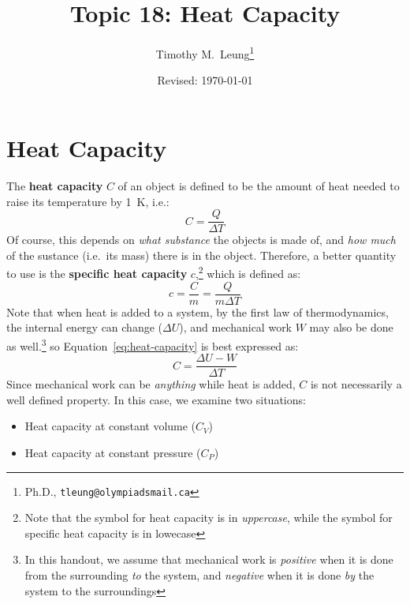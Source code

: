 \documentclass[11pt]{article}
\title{Topic 18: Heat Capacity}
\author{Timothy M.\ Leung\thanks{Ph.D., \texttt{tleung@olympiadsmail.ca}}}
\affil{Olympiads School\\Toronto, Ontario, Canada}
\date{Revised: \today}
\begin{document}
\maketitle


\section{Heat Capacity}

The \textbf{heat capacity} $C$ of an object is defined to be the amount of
heat needed to raise its temperature by \SI{1}{\kelvin}, i.e.:
\begin{equation}
  C=\frac{Q}{\Delta T}
  \label{eq:heat-capacity}
\end{equation}
Of course, this depends on \emph{what substance} the objects is made of, and
\emph{how much} of the sustance (i.e.\ its mass) there is in the object.
Therefore, a better quantity to use is the \textbf{specific heat capacity}
$c$,\footnote{Note that the symbol for heat capacity is in \emph{uppercase},
  while the symbol for specific heat capacity is in lowecase} which is defined
as:
\begin{equation}
  c=\frac{C}{m}=\frac{Q}{m\Delta T}
  \label{eq:specific-heat}
\end{equation}
Note that when heat is added to a system, by the first law of thermodynamics,
the internal energy can change ($\Delta U$), and mechanical work
$W$ may also be done as well.\footnote{In this handout, we assume that
  mechanical work is \emph{positive} when it is done from the surrounding
  \emph{to} the system, and \emph{negative} when it is done \emph{by} the
  system to the surroundings} so Equation~\ref{eq:heat-capacity} is best
expressed as:
\begin{equation}
  C=\frac{\Delta U-W}{\Delta T}
  \label{eq:with-1st-law}
\end{equation}
Since mechanical work can be \emph{anything} while heat is added, $C$ is not
necessarily a well defined property. In this case, we examine two situations:
\begin{itemize}[noitemsep,topsep=0pt]
\item Heat capacity at constant volume ($C_V$)
\item Heat capacity at constant pressure ($C_P$)
\end{itemize}
\end{document}
